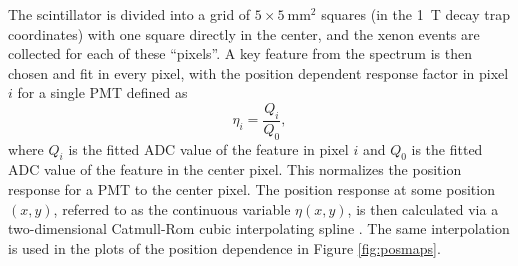 The scintillator is divided into a grid of $5\times5\mathrm{~mm}^2$ squares (in the 1~T
decay trap coordinates) with one square directly in the center,
and the xenon events are collected for each of these ``pixels''. A key feature
from the spectrum is then chosen and fit in every pixel, with the position dependent response
factor in pixel $i$ for a single PMT defined as
%
\begin{equation}
  \eta_i = \frac{Q_i}{Q_0},
\end{equation}
%
where $Q_i$ is the fitted ADC value of the feature in pixel $i$ and $Q_0$ is the fitted ADC value of the
feature in the center pixel. This normalizes the position response for a PMT to the center pixel. The
position response at some position $(x,y)$, referred to as the continuous variable $\eta(x,y)$,
is then calculated via a two-dimensional Catmull-Rom
cubic interpolating spline \cite{catmull1974}. The same interpolation is used in the plots of the
position dependence in Figure \ref{fig:posmaps}.


